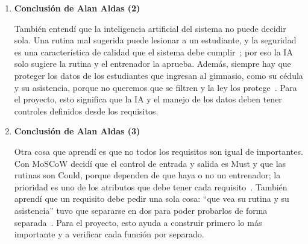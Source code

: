 \begin{enumerate}
\item \textbf{Conclusión de Alan Aldas (2)}

También entendí que la inteligencia artificial del sistema no puede decidir sola. Una rutina mal sugerida puede lesionar a un estudiante, y la seguridad es una característica de calidad que el sistema debe cumplir~\cite{iso25010}; por eso la IA solo sugiere la rutina y el entrenador la aprueba. Además, siempre hay que proteger los datos de los estudiantes que ingresan al gimnasio, como su cédula y su asistencia, porque no queremos que se filtren y la ley los protege~\cite{lopdp2021}. Para el proyecto, esto significa que la IA y el manejo de los datos deben tener controles definidos desde los requisitos.

\item \textbf{Conclusión de Alan Aldas (3)}

Otra cosa que aprendí es que no todos los requisitos son igual de importantes. Con MoSCoW decidí que el control de entrada y salida es Must y que las rutinas son Could, porque dependen de que haya o no un entrenador; la prioridad es uno de los atributos que debe tener cada requisito~\cite{ieee29148}. También aprendí que un requisito debe pedir una sola cosa: ``que vea su rutina y su asistencia'' tuvo que separarse en dos para poder probarlos de forma separada~\cite{ieee29148}. Para el proyecto, esto ayuda a construir primero lo más importante y a verificar cada función por separado.
\end{enumerate}
